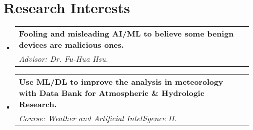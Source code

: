 \documentclass[a4paper,11pt]{article}
\makeatletter
\newcommand{\resumeSubheading}[4]{
\vspace{0.5mm}\item
    \begin{tabular*}{0.98\textwidth}[t]{l@{\extracolsep{\fill}}r}
        \textbf{#1} & \textit{\footnotesize{#4}} \\
        \textit{\footnotesize{#3}} &  \footnotesize{#2}\\
    \end{tabular*}
    \vspace{-2.4mm}
}
\newcommand{\resumeProject}[4]{
\vspace{0.5mm}\item
    \begin{tabular*}{0.98\textwidth}[t]{l@{\extracolsep{\fill}}r}
        \textbf{#1} & \textit{\footnotesize{#3}} \\
        \footnotesize{\textit{#2}} & \footnotesize{#4}
    \end{tabular*}
    \vspace{-2.4mm}
}
\newcommand{\resumeSubHeadingListStart}{\begin{itemize}[leftmargin=*,labelsep=0mm]}
\newcommand{\resumeItemListStart}{\begin{justify}\begin{itemize}[leftmargin=3ex, rightmargin=2ex, noitemsep,labelsep=1.2mm,itemsep=0mm]\small}
\newcommand{\resumeSubHeadingListEnd}{\end{itemize}\vspace{2mm}}
\newcommand{\resumeItemListEnd}{\end{itemize}\end{justify}\vspace{-2mm}}
\makeatother
\begin{document}
    
      

\section{\textbf{Research Interests}}
  \resumeSubHeadingListStart
    \resumeSubheading
      {Fooling and misleading AI/ML to believe some benign devices are malicious ones.}{}
      {Advisor: Dr. Fu-Hua Hsu.}{}
    \resumeSubheading
      {Use ML/DL to improve the analysis in meteorology with Data Bank for Atmospheric \& Hydrologic Research.}{}
      {Course: Weather and Artificial Intelligence II.}{}

  \resumeSubHeadingListEnd
  


    
\end{document}

